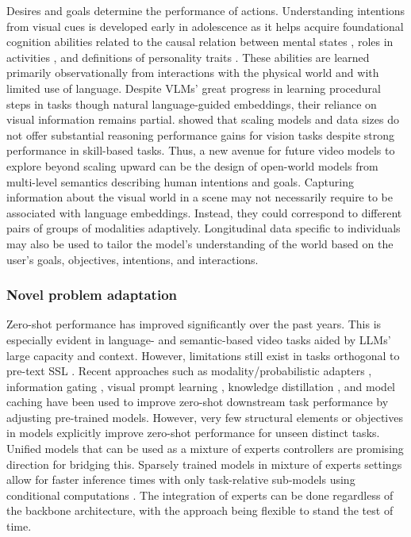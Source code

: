Desires and goals determine the performance of actions. Understanding intentions from visual cues is developed early in adolescence \citep{flavell1999cognitive} as it helps acquire foundational cognition abilities related to the causal relation between mental states \citep{flavell1998social}, roles in activities \citep{woodward2009infants}, and definitions of personality traits \citep{nelson1980factors}. These abilities are learned primarily observationally from interactions with the physical world and with limited use of language. Despite VLMs' great progress in learning procedural steps in tasks \citep{li2025llama,li2024mini,wu2024longvideobench} though natural language-guided embeddings, their reliance on visual information remains partial. \citet{al2024unibench} showed that scaling models and data sizes do not offer substantial reasoning performance gains for vision tasks despite strong performance in skill-based tasks. Thus, a new avenue for future video models to explore beyond scaling upward can be the design of open-world models from multi-level semantics describing human intentions and goals. Capturing information about the visual world in a scene may not necessarily require to be associated with language embeddings. Instead, they could correspond to different pairs of groups of modalities adaptively. Longitudinal data specific to individuals may also be used to tailor the model's understanding of the world based on the user's goals, objectives, intentions, and interactions.



\subsubsection{Novel problem adaptation}

Zero-shot performance has improved significantly over the past years. This is especially evident in language- and semantic-based video tasks aided by LLMs' large capacity and context. However, limitations still exist in tasks orthogonal to pre-text SSL \citep{liu2024mmbench}. Recent approaches such as modality/probabilistic adapters \citep{lin2023vision,sung2022vl,upadhyay2023probvlm}, information gating \citep{zhang2024llama}, visual prompt learning \citep{khattak2023maple}, knowledge distillation \citep{mistretta2024improving}, and model caching \citep{zhang2021tip} have been used to improve zero-shot downstream task performance by adjusting pre-trained models. However, very few structural elements or objectives in models explicitly improve zero-shot performance for unseen distinct tasks. Unified models that can be used as a mixture of experts controllers  \citep{bao2022vlmo,lin2024moe,wang2022image,yu2024boosting} are promising direction for bridging this. Sparsely trained models in mixture of experts settings allow for faster inference times with only task-relative sub-models using conditional computations \citep{bengio2013estimating,jacobs1991adaptive}. The integration of experts can be done regardless of the backbone architecture, with the approach being flexible to stand the test of time.

